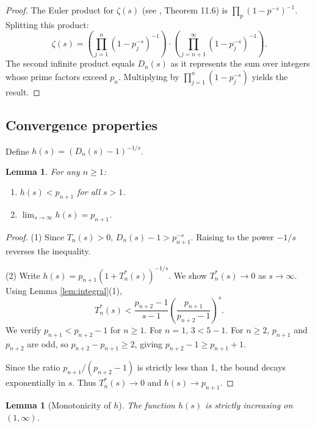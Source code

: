 \documentclass[12pt]{article}
\theoremstyle{plain}
\newtheorem{lemma}[theorem]{Lemma}
\theoremstyle{definition}
\theoremstyle{remark}
\begin{document}
\begin{proof}
The Euler product for $\zeta(s)$ (see \cite{Apostol}, Theorem 11.6) is $\prod_{p} (1-p^{-s})^{-1}$. Splitting this product:
\[
\zeta(s) = \left(\prod_{j=1}^{n}(1-p_j^{-s})^{-1}\right) \cdot \left(\prod_{j=n+1}^{\infty}(1-p_j^{-s})^{-1}\right).
\]
The second infinite product equals $D_n(s)$ as it represents the sum over integers whose prime factors exceed $p_n$. Multiplying by $\prod_{j=1}^{n} (1-p_j^{-s})$ yields the result.
\end{proof}

\subsection{Convergence properties}

Define $h(s) = (D_n(s)-1)^{-1/s}$.

\begin{lemma}
\label{lem:convergence}
For any $n \ge 1$:
\begin{enumerate}
\item $h(s) < p_{n+1}$ for all $s > 1$.
\item $\lim_{s\to\infty} h(s) = p_{n+1}$.
\end{enumerate}
\end{lemma}

\begin{proof}
(1) Since $T_n(s)>0$, $D_n(s) - 1 > p_{n+1}^{-s}$. Raising to the power $-1/s$ reverses the inequality.

(2) Write $h(s) = p_{n+1} (1 + T_n^*(s))^{-1/s}$. We show $T_n^*(s) \to 0$ as $s \to \infty$. Using Lemma \ref{lem:integral}(1),
\[
T_n^*(s) < \frac{p_{n+2}-1}{s-1} \left(\frac{p_{n+1}}{p_{n+2}-1}\right)^s.
\]
We verify $p_{n+1} < p_{n+2} - 1$ for $n \geq 1$. For $n=1$, $3 < 5-1$. For $n \geq 2$, $p_{n+1}$ and $p_{n+2}$ are odd, so $p_{n+2} - p_{n+1} \geq 2$, giving $p_{n+2}-1 \geq p_{n+1}+1$.

Since the ratio $p_{n+1}/(p_{n+2}-1)$ is strictly less than 1, the bound decays exponentially in $s$. Thus $T_n^*(s) \to 0$ and $h(s) \to p_{n+1}$.
\end{proof}

\begin{lemma}[Monotonicity of $h$]
\label{lem:h_monotone}
The function $h(s)$ is strictly increasing on $(1, \infty)$.
\end{lemma}
\end{document}
